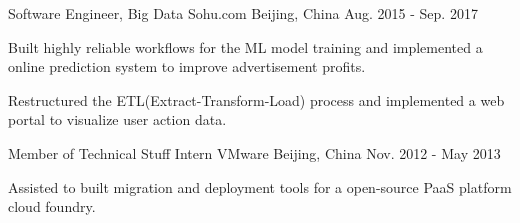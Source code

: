 \begin{cventries}
  \cventry
    {Software Engineer, Big Data} %
    {Sohu.com} %
    {Beijing, China} %
    {Aug. 2015 - Sep. 2017} %
    {
        \begin{cvitems}
          \item{Built highly reliable workflows for the ML model training and implemented a online prediction system to improve advertisement profits.}
          \item{Restructured the ETL(Extract-Transform-Load) process and implemented a web portal to visualize user action data.}
        \end{cvitems}
    }
    
  \cventry
    {Member of Technical Stuff Intern} %
    {VMware} %
    {Beijing, China} %
    {Nov. 2012 - May 2013} %
    {
      \begin{cvitems}
        \item{Assisted to built migration and deployment tools for a open-source PaaS platform cloud foundry.}
      \end{cvitems}
    }

\end{cventries}
